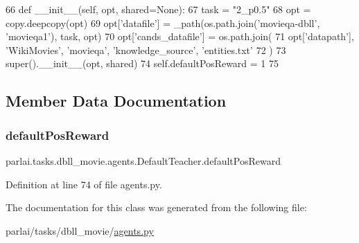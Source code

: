 \begin{DoxyCode}
66     \textcolor{keyword}{def }\_\_init\_\_(self, opt, shared=None):
67         task = \textcolor{stringliteral}{"2\_p0.5"}
68         opt = copy.deepcopy(opt)
69         opt[\textcolor{stringliteral}{'datafile'}] = \_path(os.path.join(\textcolor{stringliteral}{'movieqa-dbll'}, \textcolor{stringliteral}{'movieqa1'}), task, opt)
70         opt[\textcolor{stringliteral}{'cands\_datafile'}] = os.path.join(
71             opt[\textcolor{stringliteral}{'datapath'}], \textcolor{stringliteral}{'WikiMovies'}, \textcolor{stringliteral}{'movieqa'}, \textcolor{stringliteral}{'knowledge\_source'}, \textcolor{stringliteral}{'entities.txt'}
72         )
73         super().\_\_init\_\_(opt, shared)
74         self.defaultPosReward = 1
75 \end{DoxyCode}


\subsection{Member Data Documentation}
\mbox{\label{classparlai_1_1tasks_1_1dbll__movie_1_1agents_1_1DefaultTeacher_a8349f6694fcf25ac83d5f0972d99fede}} 
\subsubsection{\texorpdfstring{default\+Pos\+Reward}{defaultPosReward}}
{\footnotesize\ttfamily parlai.\+tasks.\+dbll\+\_\+movie.\+agents.\+Default\+Teacher.\+default\+Pos\+Reward}



Definition at line 74 of file agents.\+py.



The documentation for this class was generated from the following file\+:\begin{DoxyCompactItemize}
\item 
parlai/tasks/dbll\+\_\+movie/\hyperlink{parlai_2tasks_2dbll__movie_2agents_8py}{agents.\+py}\end{DoxyCompactItemize}
